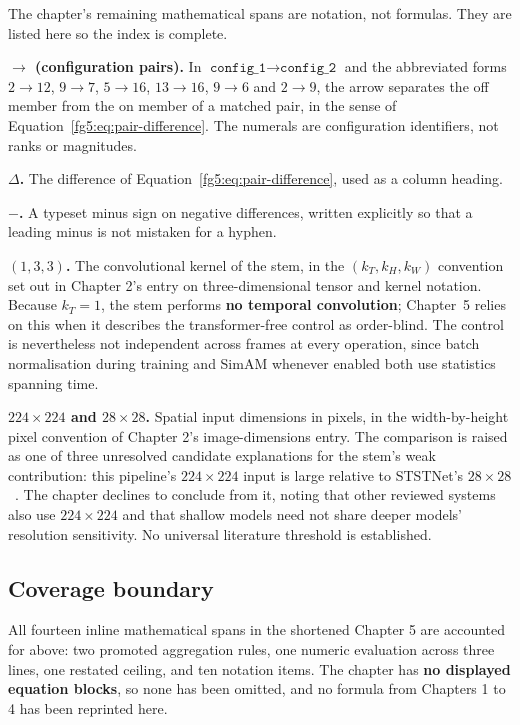 \documentclass[11pt,a4paper]{article}
\numberwithin{equation}{section}
\begin{document}
The chapter's remaining mathematical spans are notation, not formulas. They
are listed here so the index is complete.

\textbf{$\rightarrow$ (configuration pairs).} In
$\texttt{config\_1} \rightarrow \texttt{config\_2}$ and the abbreviated forms
$2\rightarrow12$, $9\rightarrow7$, $5\rightarrow16$, $13\rightarrow16$,
$9\rightarrow6$ and $2\rightarrow9$, the arrow separates the off member from
the on member of a matched pair, in the sense of
Equation~\eqref{fg5:eq:pair-difference}. The numerals are configuration
identifiers, not ranks or magnitudes.

\textbf{$\Delta$.} The difference of
Equation~\eqref{fg5:eq:pair-difference}, used as a column heading.

\textbf{$-$.} A typeset minus sign on negative differences, written
explicitly so that a leading minus is not mistaken for a hyphen.

\textbf{$(1,3,3)$.} The convolutional kernel of the stem, in the
$(k_T,k_H,k_W)$ convention set out in Chapter 2's entry on
three-dimensional tensor and kernel notation. Because $k_T = 1$, the stem performs \textbf{no temporal
convolution}; Chapter~5 relies on this when it describes the transformer-free
control as order-blind. The control is nevertheless not independent across
frames at every operation, since batch normalisation during training and
SimAM whenever enabled both use statistics spanning time.

\textbf{$224\times224$ and $28\times28$.} Spatial input dimensions in pixels,
in the width-by-height pixel convention of Chapter 2's image-dimensions
entry. The comparison is raised as one of three unresolved candidate
explanations for the stem's weak contribution: this pipeline's
$224\times224$ input is large relative to STSTNet's
$28\times28$~\cite{liong2019b}. The chapter declines to conclude from it,
noting that other reviewed systems also use $224\times224$ and that shallow
models need not share deeper models' resolution sensitivity. No universal
literature threshold is established.

\subsection{Coverage boundary}

All fourteen inline mathematical spans in the shortened Chapter 5 are
accounted for above: two promoted aggregation rules, one numeric evaluation
across three lines, one restated ceiling, and ten notation items. The chapter
has \textbf{no displayed equation blocks}, so none has been omitted, and no
formula from Chapters 1 to 4 has been reprinted here.
\end{document}
